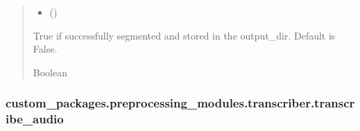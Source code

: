 \documentclass[letterpaper,10pt,english]{sphinxhowto}
\begin{document}
\begin{fulllineitems}
\begin{quote}
\begin{description}
\begin{itemize}
\item {} 
\sphinxAtStartPar
{} ()

\end{itemize}

\sphinxAtStartPar
True if successfully segmented and stored in the output\_dir.
Default is False.

\sphinxAtStartPar
Boolean

\end{description}\end{quote}

\end{fulllineitems}


\sphinxstepscope


\subsubsection{custom\_packages.preprocessing\_modules.transcriber.transcribe\_audio}
\label{\detokenize{_autosummary/custom_packages.preprocessing_modules.transcriber.transcribe_audio:custom-packages-preprocessing-modules-transcriber-transcribe-audio}}\label{\detokenize{_autosummary/custom_packages.preprocessing_modules.transcriber.transcribe_audio::doc}}
\end{document}
